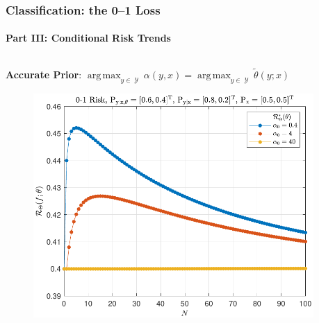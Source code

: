 \documentclass[aspectratio=169,usenames,dvipsnames]{beamer}
\DeclareMathOperator*{\argmax}{arg\,max}
\DeclareMathOperator{\Ycal}{\mathcal{Y}}
\begin{document}
\begin{frame}
\frametitle{Classification: the 0--1 Loss}
\framesubtitle{Part III: Conditional Risk Trends}

\begin{columns}[c]

\begin{column}{0.5\linewidth}

\centering
\textbf{Accurate Prior}: $\argmax_{y \in \Ycal} \alpha(y,x) = \argmax_{y \in \Ycal} \tilde{\theta}(y;x)$
%
\begin{figure}
\centering
\includegraphics[width=0.9\linewidth]{Risk_cond_01_Dir_N_leg_a0__subj_good.pdf}
\end{figure}


\end{column}

\begin{column}{0.5\linewidth}


\end{column}
\end{columns}
\end{frame}
\end{document}
